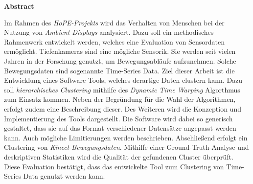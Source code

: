 \vspace*{2cm}

\begin{center}
    \textbf{Abstract}
\end{center}

\vspace*{1cm}

\noindent
Im Rahmen des \emph{HoPE-Projekts} wird das Verhalten von Menschen
bei der Nutzung von \emph{Ambient Displays} analysiert.
Dazu soll ein methodisches Rahmenwerk entwickelt werden,
welches eine Evaluation von Sensordaten ermöglicht.
Tiefenkameras sind eine mögliche Sensorik.
Sie werden seit vielen Jahren in der Forschung genutzt,
um Bewegungsabläufe aufzunehmen.
Solche Bewegungsdaten sind sogenannte Time-Series Data.
Ziel dieser Arbeit ist die Entwicklung eines Software-Tools,
welches derartige Daten clustern kann.
Dazu soll \emph{hierarchisches Clustering}
mithilfe des \emph{Dynamic Time Warping} Algorthmus zum Einsatz kommen.
Neben der Begründung für die Wahl der Algorithmen,
erfolgt zudem eine Beschreibung dieser.
Des Weiteren wird die Konzeption und Implementierung des Tools dargestellt.
Die Software wird dabei so generisch gestaltet,
dass sie auf das Format verschiedener Datensätze angepasst werden kann.
Auch mögliche Limitierungen werden beschrieben.
Abschließend erfolgt ein Clustering von \emph{Kinect-Bewegungsdaten}.
Mithilfe einer Ground-Truth-Analyse und deskriptiven Statistiken
wird die Qualität der gefundenen Cluster überprüft.
Diese Evaluation bestätigt, dass das entwickelte Tool zum Clustering
von Time-Series Data genutzt werden kann.